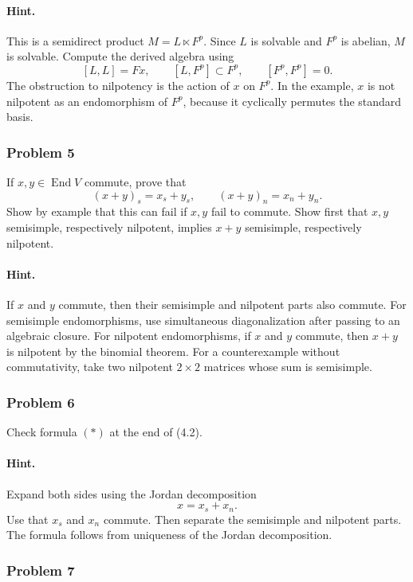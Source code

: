 \documentclass[12pt, a4paper]{article}
\begin{document}
\paragraph{Hint.}
This is a semidirect product \(M=L\ltimes F^p\). Since \(L\) is solvable and
\(F^p\) is abelian, \(M\) is solvable. Compute the derived algebra using
\[
[L,L]=Fx,\qquad [L,F^p]\subset F^p,\qquad [F^p,F^p]=0.
\]
The obstruction to nilpotency is the action of \(x\) on \(F^p\). In the example,
\(x\) is not nilpotent as an endomorphism of \(F^p\), because it cyclically
permutes the standard basis.

\subsubsection{Problem 5}

If \(x,y\in \operatorname{End}V\) commute, prove that
\[
(x+y)_s=x_s+y_s,
\qquad
(x+y)_n=x_n+y_n.
\]
Show by example that this can fail if \(x,y\) fail to commute. Show first that
\(x,y\) semisimple, respectively nilpotent, implies \(x+y\) semisimple,
respectively nilpotent.

\paragraph{Hint.}
If \(x\) and \(y\) commute, then their semisimple and nilpotent parts also
commute. For semisimple endomorphisms, use simultaneous diagonalization after
passing to an algebraic closure. For nilpotent endomorphisms, if \(x\) and \(y\)
commute, then \(x+y\) is nilpotent by the binomial theorem. For a counterexample
without commutativity, take two nilpotent \(2\times 2\) matrices whose sum is
semisimple.

\subsubsection{Problem 6}

Check formula \((*)\) at the end of (4.2).

\paragraph{Hint.}
Expand both sides using the Jordan decomposition
\[
x=x_s+x_n.
\]
Use that \(x_s\) and \(x_n\) commute. Then separate the semisimple and nilpotent
parts. The formula follows from uniqueness of the Jordan decomposition.

\subsubsection{Problem 7}
\end{document}
